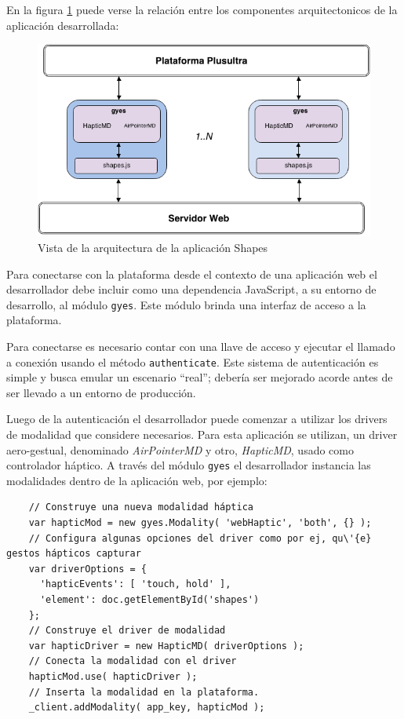 En la figura \ref{fig:demo_shapes_app_arq} puede verse la relación entre los componentes arquitectonicos de la aplicación desarrollada:

\begin{center}
  \begin{figure}[h]
    \includegraphics[scale=0.6]{gfx/shapes_app_arq}
    \caption{Vista de la arquitectura de la aplicación Shapes}
    \label{fig:demo_shapes_app_arq}
  \end{figure}
\end{center}


Para conectarse con la plataforma desde el contexto de una aplicación web el desarrollador debe incluir como una dependencia JavaScript, a su entorno de desarrollo, al módulo \texttt{gyes}. Este módulo brinda una interfaz de acceso a la plataforma.

Para conectarse es necesario contar con una llave de acceso y ejecutar el llamado a conexión usando el método \texttt{authenticate}. Este sistema de autenticación es simple y busca emular un escenario ``real''; debería ser mejorado acorde antes de ser llevado a un entorno de producción.

Luego de la autenticación el desarrollador puede comenzar a utilizar los drivers de modalidad que considere necesarios. Para esta aplicación se utilizan, un driver aero-gestual, denominado \emph{AirPointerMD} y otro, \emph{HapticMD}, usado como controlador háptico. A través del módulo \texttt{gyes} el desarrollador instancia las modalidades dentro de la aplicación web, por ejemplo:

\begin{lstlisting}
    // Construye una nueva modalidad háptica
    var hapticMod = new gyes.Modality( 'webHaptic', 'both', {} ); 
    // Configura algunas opciones del driver como por ej, qu\'{e} gestos hápticos capturar
    var driverOptions = {
      'hapticEvents': [ 'touch, hold' ],
      'element': doc.getElementById('shapes')
    };
    // Construye el driver de modalidad
    var hapticDriver = new HapticMD( driverOptions );
    // Conecta la modalidad con el driver
    hapticMod.use( hapticDriver );
    // Inserta la modalidad en la plataforma.
    _client.addModality( app_key, hapticMod );
\end{lstlisting}

